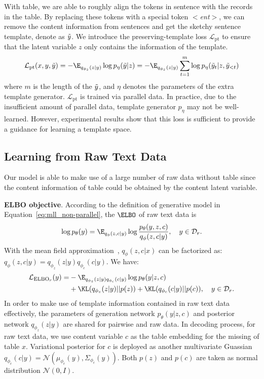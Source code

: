 With table, we are able to roughly align the tokens in sentence with the records in the table. By replacing these tokens with a special token \textit{$<$ent$>$}, we can remove the content information from sentences and get the sketchy sentence template, denote as $\Tilde{y}$. We introduce the preserving-template loss $\mathcal{L}_{\text{pt}}$ to ensure that the latent variable $z$ only contains the information of the template.
\begin{equation*}
    \mathcal{L}_{\text{pt}}(x,y,\Tilde{y}) = - \E_{q_{\phi_z}(z|y)}\log p_{\eta}(\Tilde{y}|z) = - \E_{q_{\phi_z}(z|y)} \sum_{t=1}^m \log p_{\eta}(\Tilde{y}_t|z, \Tilde{y}_{<t})
\end{equation*}
where $m$ is the length of the $\Tilde{y}$, and $\eta$ denotes the parameters of the extra template generator. 
$\mathcal{L}_{\text{pt}}$ is trained via parallel data. In practice, due to the insufficient amount of parallel data, template generator $p_\eta$ may not be well-learned. However, experimental results show that this loss is sufficient to provide a guidance for learning a template space.












\subsection{Learning from Raw Text Data}
\label{sec:object_non-parallel}

Our model is able to make use of a large number of raw data without table since the content information of table could be obtained by the content latent variable.

\noindent\textbf{ELBO objective}. \quad
According to the definition of generative model in Equation~\ref{eq:mll_non-parallel}, the $\ELBO$ of raw text data is
\begin{equation*}
    \log p_\theta(y) = \E_{q_\phi(z,c|y)}\log \frac{p_\theta(y,z,c)}{q_\phi(z,c | y)}, \quad y \in \mathcal{D}_r.
\end{equation*}
With the mean field approximation~\citep{xing2002generalized}, $q_\phi(z, c|x)$ can be factorized as: $q_\phi(z,c|y) = q_{\phi_z}(z|y) q_{\phi_c}(c|y)$.
We have:
\begin{align*}
    \mathcal{L}_{\text{ELBO}_r}(y) = & - \E_{q_{\phi_z}(z|y) q_{\phi_c}(c|y)}\log p_{\theta}(y|z,c)  \\
    & + \KL(q_{\phi_z}(z|y)||p(z)) + \KL(q_{\phi_c}(c|y)||p(c)), \quad y \in \mathcal{D}_r.
\end{align*}
In order to make use of template information contained in raw text data effectively, the parameters of generation network $p_{\theta}(y|z,c)$ and posterior network $q_{\phi_z}(z|y)$ are shared for pairwise and raw data. In decoding process, for raw text data, we use content variable $c$ as the table embedding for the missing of table $x$. 
Variational posterior for $c$ is deployed as another multivariate Guassian $q_{\phi_c}(c|y) = \mathcal{N}(\mu_{\phi_c}(y), \Sigma_{\phi_c}(y))$. Both $p(z)$ and $p(c)$ are taken as normal distribution $\mathcal{N}(0, I)$.

